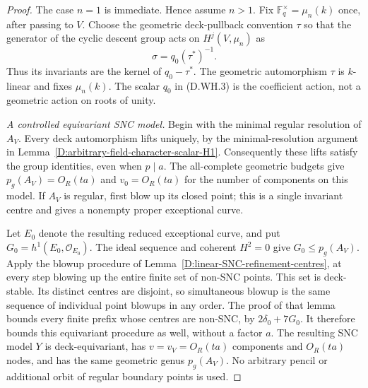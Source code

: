 \begin{proof}
The case \(n=1\) is immediate. Hence assume \(n>1\).
Fix \(\mathbb F_q^\times=\mu_n(k)\) once, after passing
to \(V\). Choose the geometric deck-pullback convention
\(\tau\) so that the generator of the cyclic descent
group acts on \(H^j(V,\mu_n)\) as
\[
                         \sigma=q_0(\tau^*)^{-1}.
                                                        \tag{D.WH.3}
\]
Thus its invariants are the kernel of \(q_0-\tau^*\).
The geometric automorphism \(\tau\) is \(k\)-linear
and fixes \(\mu_n(k)\). The scalar \(q_0\) in
(D.WH.3) is the coefficient action, not a geometric
action on roots of unity.

\emph{A controlled equivariant SNC model.}
Begin with the minimal regular resolution of \(A_V\).
Every deck automorphism lifts uniquely, by the
minimal-resolution argument in
Lemma~\ref{D:arbitrary-field-character-scalar-H1}.
Consequently these lifts satisfy the group identities,
even when \(p\mid a\).
The all-complete geometric budgets give
\(p_g(A_V)=O_R(ta)\) and \(v_0=O_R(ta)\) for the
number of components on this model.
If \(A_V\) is regular, first blow up its closed point;
this is a single invariant centre and gives a
nonempty proper exceptional curve.

Let \(E_0\) denote the resulting reduced exceptional
curve, and put \(G_0=h^1(E_0,\mathcal O_{E_0})\).
The ideal sequence and coherent \(H^2=0\) give
\(G_0\le p_g(A_V)\). Apply the blowup procedure of
Lemma~\ref{D:linear-SNC-refinement-centres}, at every
step blowing up the entire finite set of non-SNC
points. This set is deck-stable. Its distinct centres
are disjoint, so simultaneous blowup is the same
sequence of individual point blowups in any order.
The proof of that lemma bounds every finite prefix
whose centres are non-SNC, by
\(2\delta_0+7G_0\). It therefore bounds this equivariant
procedure as well, without a factor \(a\).
The resulting SNC model \(Y\) is deck-equivariant,
has \(v=v_V=O_R(ta)\) components and \(O_R(ta)\)
nodes, and has the same geometric genus \(p_g(A_V)\).
No arbitrary pencil or additional orbit of regular
boundary points is used.


\end{proof}
